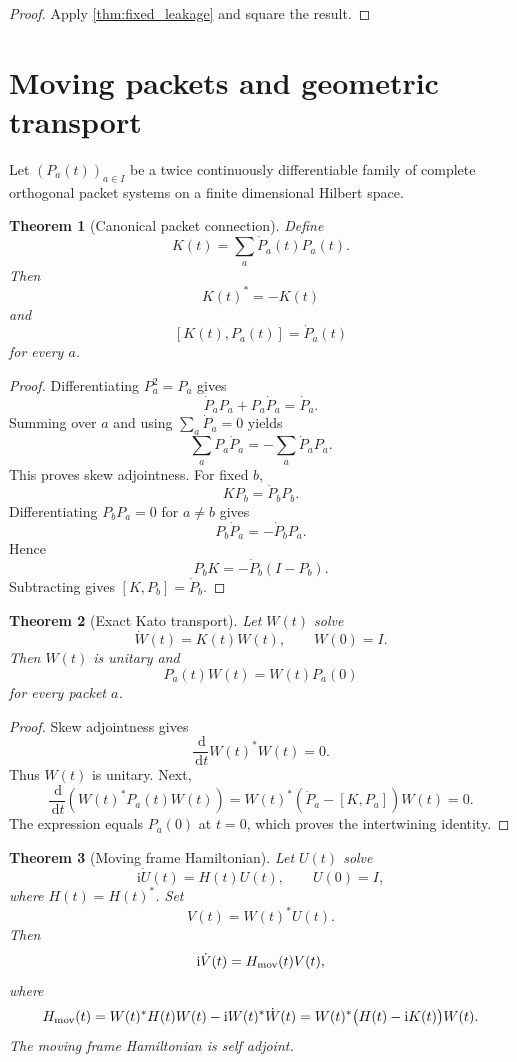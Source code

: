 \documentclass{aomart}
\newtheorem{theorem}{Theorem}[section]
\theoremstyle{definition}
\theoremstyle{remark}
\newcommand{\ii}{\mathrm i}
\newcommand{\dd}{\,\mathrm d}
\begin{document}
\begin{proof}
Apply \cref{thm:fixed_leakage} and square the result.
\end{proof}

\section{Moving packets and geometric transport}\label{sec:moving_packets}

Let \((P_a(t))_{a\in I}\) be a twice continuously differentiable family of complete orthogonal packet systems on a finite dimensional Hilbert space.

\begin{theorem}[Canonical packet connection]\label{thm:kato_connection}
Define
\[
K(t)
=
\sum_a\dot P_a(t)P_a(t).
\]
Then
\[
K(t)^*=-K(t)
\]
and
\[
[K(t),P_a(t)]=\dot P_a(t)
\]
for every \(a\).
\end{theorem}

\begin{proof}
Differentiating \(P_a^2=P_a\) gives
\[
\dot P_aP_a+P_a\dot P_a=\dot P_a.
\]
Summing over \(a\) and using \(\sum_a\dot P_a=0\) yields
\[
\sum_aP_a\dot P_a=-\sum_a\dot P_aP_a.
\]
This proves skew adjointness. For fixed \(b\),
\[
KP_b=\dot P_bP_b.
\]
Differentiating \(P_bP_a=0\) for \(a\neq b\) gives
\[
P_b\dot P_a=-\dot P_bP_a.
\]
Hence
\[
P_bK=-\dot P_b(I-P_b).
\]
Subtracting gives \([K,P_b]=\dot P_b\).
\end{proof}

\begin{theorem}[Exact Kato transport]\label{thm:kato_transport}
Let \(W(t)\) solve
\[
\dot W(t)=K(t)W(t),
\qquad
W(0)=I.
\]
Then \(W(t)\) is unitary and
\[
P_a(t)W(t)=W(t)P_a(0)
\]
for every packet \(a\).
\end{theorem}

\begin{proof}
Skew adjointness gives
\[
\frac{\dd}{\dd t}W(t)^*W(t)=0.
\]
Thus \(W(t)\) is unitary. Next,
\[
\frac{\dd}{\dd t}
\left(W(t)^*P_a(t)W(t)\right)
=
W(t)^*
\left(
\dot P_a-[K,P_a]
\right)
W(t)=0.
\]
The expression equals \(P_a(0)\) at \(t=0\), which proves the intertwining identity.
\end{proof}

\begin{theorem}[Moving frame Hamiltonian]\label{thm:moving_frame}
Let \(U(t)\) solve
\[
\ii\dot U(t)=H(t)U(t),
\qquad
U(0)=I,
\]
where \(H(t)=H(t)^*\). Set
\[
V(t)=W(t)^*U(t).
\]
Then
\[
\ii\dot V(t)=H_{\rm mov}(t)V(t),
\]
where
\[
H_{\rm mov}(t)
=
W(t)^*H(t)W(t)-\ii W(t)^*\dot W(t)
=
W(t)^*\bigl(H(t)-\ii K(t)\bigr)W(t).
\]
The moving frame Hamiltonian is self adjoint.
\end{theorem}
\end{document}
